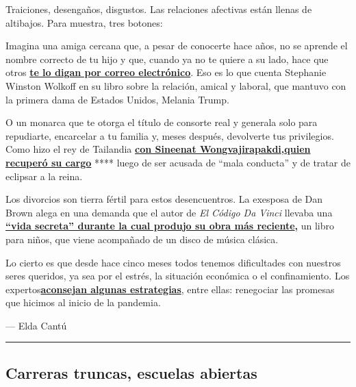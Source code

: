 Traiciones, desengaños, disgustos. Las relaciones afectivas están llenas
de altibajos. Para muestra, tres botones:

Imagina una amiga cercana que, a pesar de conocerte hace años, no se
aprende el nombre correcto de tu hijo y que, cuando ya no te quiere a su
lado, hace que otros
\textbf{\href{https://www.nytimes3xbfgragh.onion/es/2020/09/01/espanol/cultura/melania-trump-libro.html}{te
lo digan por correo electrónico}}. Eso es lo que cuenta Stephanie
Winston Wolkoff en su libro sobre la relación, amical y laboral, que
mantuvo con la primera dama de Estados Unidos, Melania Trump.

O un monarca que te otorga el título de consorte real y generala solo
para repudiarte, encarcelar a tu familia y, meses después, devolverte
tus privilegios. Como hizo el rey de Tailandia
\textbf{\href{https://www.nytimes3xbfgragh.onion/es/2020/09/02/espanol/mundo/consorte-real-tailandia.html}{con
Sineenat
Wongvajirapakdi},\href{https://www.nytimes3xbfgragh.onion/es/2020/09/02/espanol/mundo/consorte-real-tailandia.html}{quien
recuperó su cargo}} **** luego de ser acusada de ``mala conducta'' y de
tratar de eclipsar a la reina.

Los divorcios son tierra fértil para estos desencuentros. La exesposa de
Dan Brown alega en una demanda que el autor de \emph{El Código Da Vinci}
llevaba una
\textbf{\href{http://nytimes3xbfgragh.onion/es/2020/09/03/espanol/estilos-de-vida/dan-brown-divorcio-disco.html}{``vida
secreta'' durante la cual produjo su obra más reciente},} un libro para
niños, que viene acompañado de un disco de música clásica.

Lo cierto es que desde hace cinco meses todos tenemos dificultades con
nuestros seres queridos, ya sea por el estrés, la situación económica o
el confinamiento. Los
expertos\href{https://www.nytimes3xbfgragh.onion/es/2020/09/02/espanol/estilos-de-vida/como-poner-limites-a-tus-familiares-durante-la-pandemia.html}{}\textbf{\href{https://www.nytimes3xbfgragh.onion/es/2020/09/02/espanol/estilos-de-vida/como-poner-limites-a-tus-familiares-durante-la-pandemia.html}{aconsejan
algunas estrategias}}, entre ellas: renegociar las promesas que hicimos
al inicio de la pandemia.

--- Elda Cantú

\begin{center}\rule{0.5\linewidth}{\linethickness}\end{center}

\hypertarget{carreras-truncas-escuelas-abiertas}{%
\subsection{Carreras truncas, escuelas
abiertas}\label{carreras-truncas-escuelas-abiertas}}

